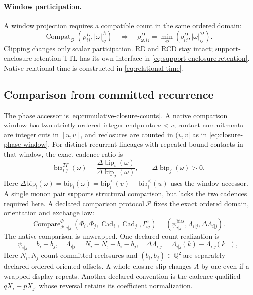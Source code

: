 \paragraph{Window participation.}
A window projection requires a compatible count in the same ordered domain:
\begin{equation}
\operatorname{Compat}_{\mathcal D}(\rho^D_{ij},|\omega|^{\mathcal D}_{ij})
\quad\Longrightarrow\quad
\rho^D_{\omega,ij}=\min_{\mathcal D}(\rho^D_{ij},|\omega|^{\mathcal D}_{ij}).
\label{eq:window-clipped-rho}
\end{equation}
Clipping changes only scalar participation. RD and RCD stay intact;
support-enclosure retention TTL has its own interface in
\eqref{eq:support-enclosure-retention}. Native relational time is constructed in
\eqref{eq:relational-time}.

\subsection{Comparison from committed recurrence}
The phase accessor is \eqref{eq:cumulative-closure-counts}. A native comparison
window has two strictly ordered integer endpoints \(u<v\); contact commitments
are integer cuts in \([u,v]\), and reclosures are counted in \((u,v]\) as in
\eqref{eq:closure-phase-window}. For distinct recurrent lineages with repeated
bound contacts in that window, the exact cadence ratio is
\begin{equation}
\operatorname{biz}^{TF}_{i|j}(\omega)=
\frac{\Delta\operatorname{bip}_i(\omega)}{\Delta\operatorname{bip}_j(\omega)},
\qquad\Delta\operatorname{bip}_j(\omega)>0.
\label{eq:cadence-ratio}
\end{equation}
Here \(\Delta\mathrm{bip}_i(\omega)=\mathrm{bip}_i(\omega)
=\mathrm{bip}^{\le}_i(v)-\mathrm{bip}^{\le}_i(u)\) uses the window accessor.
A single monon pair supports structural comparison, but lacks the two
cadences required here. A declared comparison protocol \(\mathcal P\) fixes
the exact ordered domain, orientation and exchange law:
\begin{equation}
\operatorname{Compare}^{\Phi}_{\mathcal P,i|j}
(\Phi_i,\Phi_j,\operatorname{Cad}_i,\operatorname{Cad}_j,\Gamma^\times_{ij})
=(\psi^{\mathrm{bias}}_{i|j},\Lambda_{i|j},\Delta\Lambda_{i|j}).
\label{eq:native-comparator}
\end{equation}
The native comparison is unwrapped. One declared count realization is
\begin{equation}
\psi_{i|j}=b_i-b_j,\quad
\Lambda_{i|j}=N_i-N_j+b_i-b_j,\quad
\Delta\Lambda_{i|j}=\Lambda_{i|j}(k)-\Lambda_{i|j}(k^-),
\label{eq:count-comparator-realization}
\end{equation}
Here \(N_i,N_j\) count committed reclosures and
\((b_i,b_j)\in\mathbb Q^2\) are separately declared ordered oriented offsets.
A whole-closure slip changes \(\Lambda\) by one even if a wrapped display repeats.
Another declared convention is the cadence-qualified \(qX_i-pX_j\), whose
reversal retains its coefficient normalization.

